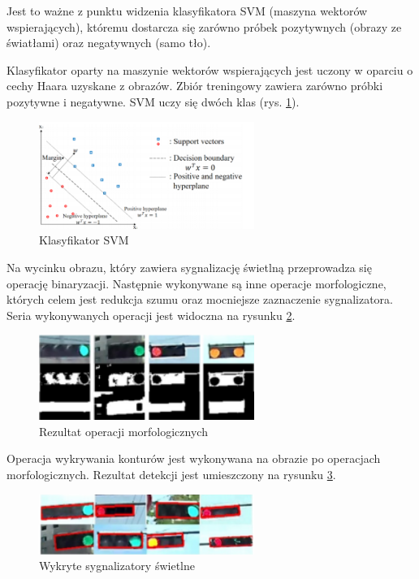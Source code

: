 Jest to ważne z punktu widzenia klasyfikatora SVM (maszyna wektorów wspierających), któremu dostarcza się zarówno próbek pozytywnych (obrazy ze światłami) oraz negatywnych (samo tło).

Klasyfikator oparty na maszynie wektorów wspierających jest uczony w oparciu o cechy Haara uzyskane z obrazów.
Zbiór treningowy zawiera zarówno próbki pozytywne i negatywne. 
SVM uczy się dwóch klas (rys. \ref{fig:traffic_light2_svm}).

\begin{figure}
  \centering
  \includegraphics[width=7cm]{img/traffic_light2_svm.png}
  \caption{Klasyfikator SVM\cite{T9}}
  \label{fig:traffic_light2_svm}
\end{figure}

Na wycinku obrazu, który zawiera sygnalizację świetlną przeprowadza się operację binaryzacji.
Następnie wykonywane są inne operacje morfologiczne, których celem jest redukcja szumu oraz mocniejsze zaznaczenie sygnalizatora. 
Seria wykonywanych operacji jest widoczna na rysunku \ref{fig:traffic_light2_morph}.

\begin{figure}
  \centering
  \includegraphics[width=7cm]{img/traffic_light2_morph.png}
  \caption{Rezultat operacji morfologicznych\cite{T9}}
  \label{fig:traffic_light2_morph}
\end{figure}

Operacja wykrywania konturów jest wykonywana na obrazie po operacjach morfologicznych. 
Rezultat detekcji jest umieszczony na rysunku \ref{fig:traffic_light2_result}.

\begin{figure}
  \centering
  \includegraphics[width=7cm]{img/traffic_light2_results.png}
  \caption{Wykryte sygnalizatory świetlne\cite{T9}}
  \label{fig:traffic_light2_result}
\end{figure}

